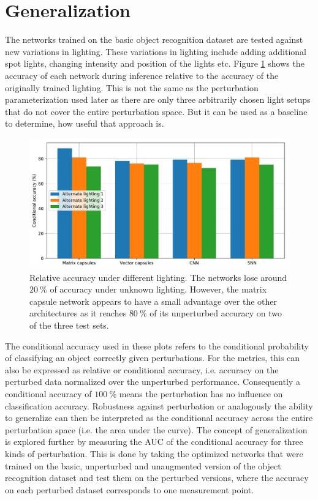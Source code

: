 \section{Generalization}
The networks trained on the basic object recognition dataset are tested against new variations in lighting. These variations in lighting include adding additional spot lights, changing intensity and position of the lights etc. Figure \ref{fig:lighting} shows the accuracy of each network during inference relative to the accuracy of the originally trained lighting. This is not the same as the perturbation parameterization used later as there are only three arbitrarily chosen light setups that do not cover the entire perturbation space. But it can be used as a baseline to determine, how useful that approach is.
\begin{figure}[H]
    \centering
\includegraphics[width=\textwidth]{figures/lighting.pdf}
\caption[Relative accuracy under different lighting]{Relative accuracy under different lighting. The networks lose around $\SI{20}{\percent}$ of accuracy under unknown lighting. However, the matrix capsule network appears to have a small advantage over the other architectures as it reaches $\SI{80}{\percent}$ of its unperturbed accuracy on two of the three test sets.}\label{fig:lighting}
\end{figure}\noindent
The conditional accuracy used in these plots refers to the conditional probability of classifying an object correctly given perturbations. For the metrics, this can also be expressed as relative or conditional accuracy, i.e. accuracy on the perturbed data normalized over the unperturbed performance. Consequently a conditional accuracy of $\SI{100}{\percent}$ means the perturbation has no influence on classification accuracy. Robustness against perturbation or analogously the ability to generalize can then be interpreted as the conditional accuracy across the entire perturbation space (i.e. the area under the curve). The concept of generalization is explored further by measuring the AUC of the conditional accuracy for three kinds of perturbation. This is done by taking the optimized networks that were trained on the basic, unperturbed and unaugmented version of the object recognition dataset and test them on the perturbed versions, where the accuracy on each perturbed dataset corresponds to one measurement point.\newpage\noindent
